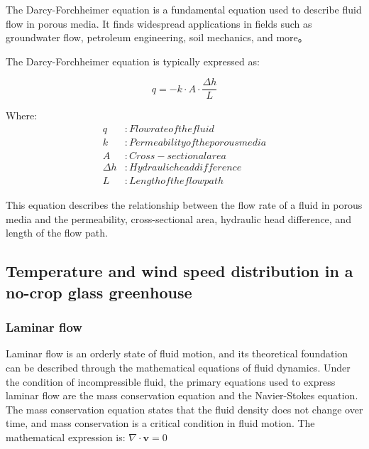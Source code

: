\documentclass{apmcmthesis}
\begin{document}
The Darcy-Forchheimer equation is a fundamental equation used to describe fluid flow in porous media. It finds widespread applications in fields such as groundwater flow, petroleum engineering, soil mechanics, and more。

The Darcy-Forchheimer equation is typically expressed as:

\begin{equation}
q = -k \cdot A \cdot \frac{\Delta h}{L}
\end{equation}

Where:
\begin{align*}
q & : Flow rate of the fluid \\
k & : Permeability of the porous media \\
A & : Cross-sectional area \\
\Delta h & : Hydraulic head difference \\
L & : Length of the flow path
\end{align*}

This equation describes the relationship between the flow rate of a fluid in porous media and the permeability, cross-sectional area, hydraulic head difference, and length of the flow path.

\subsection{Temperature and wind speed distribution in a no-crop glass greenhouse}

\subsubsection{Laminar flow}

  Laminar flow is an orderly state of fluid motion, and its theoretical foundation can be described through the mathematical equations of fluid dynamics. Under the condition of incompressible fluid, the primary equations used to express laminar flow are the mass conservation equation and the Navier-Stokes equation. The mass conservation equation states that the fluid density does not change over time, and mass conservation is a critical condition in fluid motion. The mathematical expression is:
  $\nabla \cdot \mathbf{v} = 0$
\end{document}
